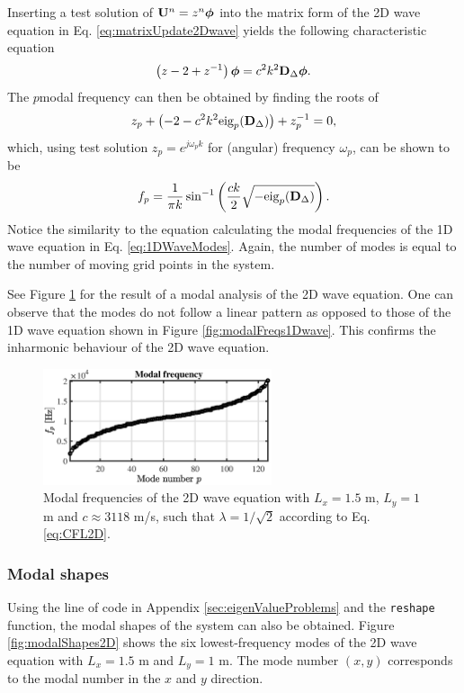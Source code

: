 Inserting a test solution of $\mathbf{U}^n = z^n\boldsymbol{\phi}$ into the matrix form of the 2D wave equation in Eq. \eqref{eq:matrixUpdate2Dwave} yields the following characteristic equation
\begin{equation}
   \left(z - 2 + z^{-1}\right)\boldsymbol{\phi} = c^2k^2\mathbf{D}_\Delta\boldsymbol{\phi}.
\end{equation}
The $p$\th modal frequency can then be obtained by finding the roots of 
\begin{equation}
    z_p + \left(-2 - c^2k^2\text{eig}_p(\mathbf{D}_\Delta)\right) + z_p^{-1} = 0,
\end{equation}
which, using test solution $z_p = e^{j\omega_p k}$ for (angular) frequency $\omega_p$, can be shown to be 
\begin{equation}\label{eq:2DWaveModes}
    f_p = \frac{1}{\pi k}\sin^{-1}\left(\frac{ck}{2}\sqrt{-\text{eig}_p(\mathbf{D}_\Delta)}\right).
\end{equation}
Notice the similarity to the equation calculating the modal frequencies of the 1D wave equation in Eq. \eqref{eq:1DWaveModes}. Again, the number of modes is equal to the number of moving grid points in the system. 

See Figure \ref{fig:modalFreqs2Dwave} for the result of a modal analysis of the 2D wave equation. One can observe that the modes do not follow a linear pattern as opposed to those of the 1D wave equation shown in Figure \ref{fig:modalFreqs1Dwave}. This confirms the inharmonic behaviour of the 2D wave equation. 
\begin{figure}[h]
    \centering
    \includegraphics[width = 0.6\textwidth]{figures/resonators/2d/modes2Dwave.eps}
    \caption{Modal frequencies of the 2D wave equation with $L_x = 1.5$ m, $L_y = 1$ m and $c\approx 3118$ m/s, such that $\lambda = 1/\sqrt{2}$ according to Eq. \eqref{eq:CFL2D}. \label{fig:modalFreqs2Dwave}}
\end{figure}
\subsubsection{Modal shapes}
Using the line of code in Appendix \ref{sec:eigenValueProblems} and the \texttt{reshape} function, the modal shapes of the system can also be obtained. Figure \ref{fig:modalShapes2D} shows the six lowest-frequency modes of the 2D wave equation with $L_x = 1.5$ m and $L_y = 1$ m. The mode number $(x,y)$ corresponds to the modal number in the $x$ and $y$ direction.

